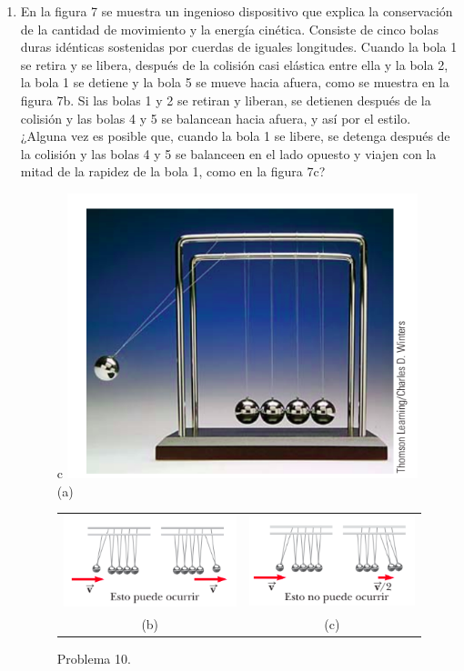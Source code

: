 \documentclass{article}
\begin{document}
\begin{enumerate}
\item En la figura 7 se muestra un ingenioso dispositivo que explica la conservación de la cantidad de movimiento
y la energía cinética. Consiste de cinco bolas duras idénticas sostenidas por cuerdas de iguales longitudes. Cuando la bola 1 se retira y se libera, después de la colisión casi elástica entre ella y la bola 2, la bola 1 se detiene y la bola 5 se mueve hacia afuera, como se muestra en la figura 7b. Si las bolas 1 y 2 se retiran y liberan, se detienen después de la colisión y las bolas 4 y 5 se balancean hacia afuera, y así por el estilo. ¿Alguna vez es posible que, cuando la bola 1 se libere, se detenga después de la colisión y las bolas 4 y 5 se balanceen en el lado opuesto y viajen con la mitad de la rapidez de la bola 1, como en la figura 7c?

\begin{figure}[H]
\centering
\begin{tabular}{c}
\includegraphics[scale=0.3]{problema_10a.png}\\
(a)\\
\begin{tabular}{cc}
\includegraphics[scale=0.5]{problema_10b.png} & \includegraphics[scale=0.5]{problema_10c.png}\\
(b) & (c)
\end{tabular}
\end{tabular}
\caption{Problema 10.}
\end{figure}


\end{enumerate}
\end{document}

